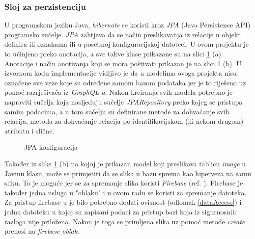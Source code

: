 \documentclass[times, utf8, zavrsni]{fer}
\begin{document}
\subsubsection{Sloj za perzistenciju}
U programskom jeziku Java, \textit{hibernate} se koristi kroz \textit{JPA} (Java Persistence API) programsko sučelje.
\textit{JPA} zahtjeva da se način preslikavanja iz relacije u objekt definira ili oznakama
ili u posebnoj konfiguracijskoj datoteci. U ovom projektu je to učinjeno preko anotacija, a sve takve klase prikazane su na
slici \ref{fig:JPA} (a). Anotacije i način anotiranja koji se mora poštivati prikazan je na slici \ref{fig:JPA} (b).
U izvornom kodu implementacije vidljivo je
da u modelima ovoga projekta nisu označene sve veze koje su određene samom bazom podataka
jer je to riješeno uz pomoć razrješivača iz \textit{GraphQL-a}. Nakon kreiranja svih modela potrebno je napraviti sučelja koja nasljeđuju sučelje
\textit{JPARepository} preko kojeg se pristupa samim podacima, a u tom sučelju su definirane metode
za dohvaćanje svih relacija, metoda za dohvaćanje relacija po identifikacijskom (ili nekom drugom) atributu
i slične.
\begin{figure}[h]
      \centering
      \caption{JPA konfiguracija}
      \label{fig:JPA}
\end{figure}
Također iz slike \ref{fig:JPA} (b)
na kojoj je prikazan model koji preslikava tablicu \textit{image} u Javinu klasu,
može se primjetiti da se slika u bazu sprema kao hiperveza na samu sliku. To je moguće jer se za
spremanje slika koristi \textit{Firebase} (ref. \cite{Firebase}). Firebase
je također jedna usluga u "oblaku" i u ovom radu se koristi za
spremanje datoteka. Za pristup firebase-u je bilo potrebno dodati ovisnost (odlomak \ref{dataAccess}) i jednu datoteku u kojoj su zapisani
podaci za pristup bazi koja iz sigurnosnih razloga nije priložena. Nakon je toga se primljena slika uz pomoć metode \textit{create}
prenosi na \textit{firebase oblak}.
\newpage
\end{document}
